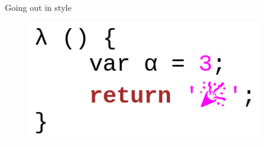 \documentclass[department=icis, slidenumbers=slide, official=true]{beamerruhuisstijl}
\begin{document}
\begin{frame}{Going out in style}
    \begin{figure}[b]
        \centering
        \includegraphics[width=0.9\textwidth]{imgs/lambda.png}
    \end{figure}
\end{frame}
\end{document}
